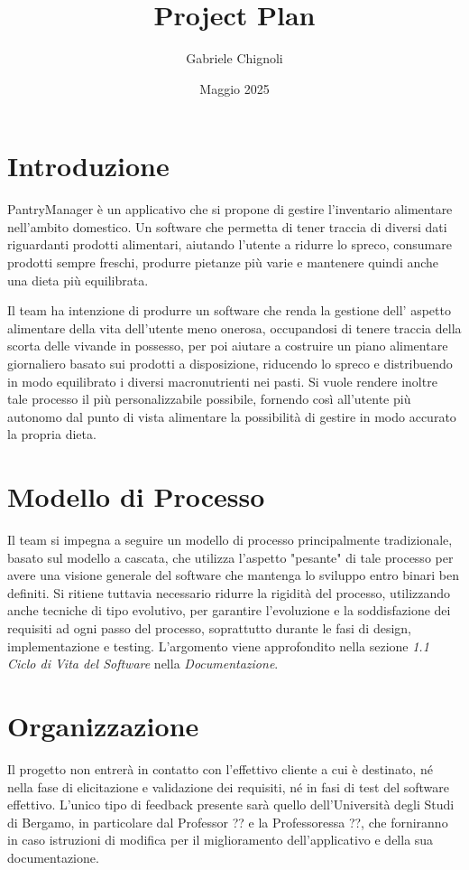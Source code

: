 \documentclass{article}
\title{\Huge Project Plan}
\author{Gabriele Chignoli}
\date{Maggio 2025}
\begin{document}
\maketitle
\newpage
\tableofcontents
\newpage

\section{Introduzione}
PantryManager è un applicativo che si propone di gestire l'inventario alimentare nell'ambito domestico. Un software che permetta di tener traccia di diversi dati riguardanti prodotti alimentari, aiutando l'utente a ridurre lo spreco, consumare prodotti sempre freschi, produrre pietanze più varie e mantenere quindi anche una dieta più equilibrata. \newline 

Il team ha intenzione di produrre un software che renda la gestione dell' aspetto alimentare della vita dell'utente meno onerosa, occupandosi di tenere traccia della scorta delle vivande in possesso, per poi aiutare a costruire un piano alimentare giornaliero basato sui prodotti a disposizione, riducendo lo spreco e distribuendo in modo equilibrato i diversi macronutrienti nei pasti. Si vuole rendere inoltre tale processo il più personalizzabile possibile, fornendo così all'utente più autonomo dal punto di vista alimentare la possibilità di gestire in modo accurato la propria dieta.   
\section{Modello di Processo}
Il team si impegna a seguire un modello di processo principalmente tradizionale, basato sul modello a cascata, che utilizza l'aspetto "pesante" di tale processo per avere una visione generale del software che mantenga lo sviluppo entro binari ben definiti. Si ritiene tuttavia necessario ridurre la rigidità del processo, utilizzando anche tecniche di tipo evolutivo, per garantire l'evoluzione e la soddisfazione dei requisiti ad ogni passo del processo, soprattutto durante le fasi di design, implementazione e testing. L'argomento viene approfondito nella sezione \textit{1.1 Ciclo di Vita del Software} nella \textit{Documentazione}.
\section{Organizzazione}
Il progetto non entrerà in contatto con l'effettivo cliente a cui è destinato, né nella fase di elicitazione e validazione dei requisiti, né in fasi di test del software effettivo. L'unico tipo di feedback presente sarà quello dell'Università degli Studi di Bergamo, in particolare dal Professor ?? e la Professoressa ??, che forniranno in caso istruzioni di modifica per il miglioramento dell'applicativo e della sua documentazione.
\end{document}
